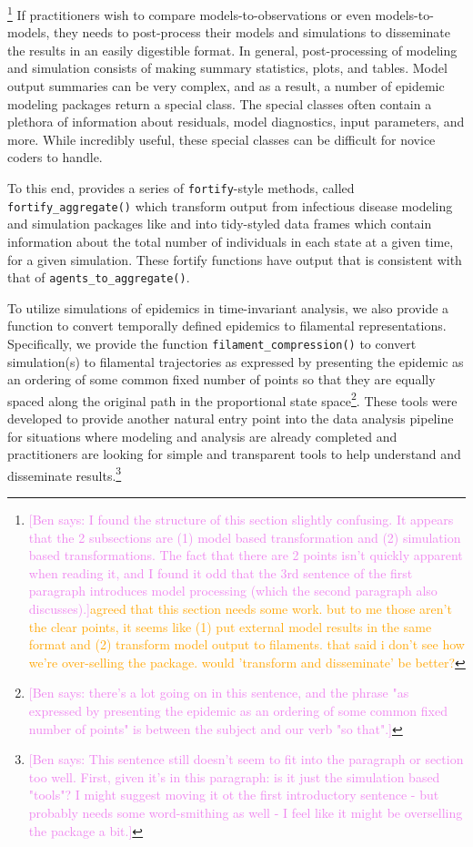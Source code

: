 \documentclass[
  shortnames]{jss}
\begin{document}
\footnote{\textcolor{violet}{[Ben says: I found the structure of this section slightly confusing. It appears that the 2 subsections are (1) model based transformation and (2) simulation based transformations. The fact that there are 2 points isn't quickly apparent when reading it, and I found it odd that the 3rd sentence of the first paragraph introduces model processing (which the second paragraph also discusses).]}\textcolor{orange}{agreed that this section needs some work.  but to me those aren't the clear points, it seems like (1) put external model results in the same format and (2) transform model output to filaments.  that said i don't see how we're over-selling the package.  would 'transform and disseminate' be better?}}
If practitioners wish to compare models-to-observations or even
models-to-models, they needs to post-process their models and
simulations to disseminate the results in an easily digestible format.
In general, post-processing of modeling and simulation consists of
making summary statistics, plots, and tables. Model output summaries can
be very complex, and as a result, a number of epidemic modeling
 packages return a special class. The special classes often
contain a plethora of information about residuals, model diagnostics,
input parameters, and more. While incredibly useful, these special
classes can be difficult for novice coders to handle.

To this end,  provides a series of
\texttt{fortify}-style methods, called \texttt{fortify\_aggregate()}
which transform output from infectious disease modeling and simulation
packages like  and  into tidy-styled data frames
which contain information about the total number of individuals in each
state at a given time, for a given simulation. These fortify functions
have output that is consistent with that of
\texttt{agents\_to\_aggregate()}.

To utilize simulations of epidemics in time-invariant analysis, we also
provide a function to convert temporally defined epidemics to filamental
representations. Specifically, we provide the function
\texttt{filament\_compression()} to convert simulation(s) to filamental
trajectories as expressed by presenting the epidemic as an ordering of
some common fixed number of points so that they are equally spaced along
the original path in the proportional state
space\footnote{\textcolor{violet}{[Ben says: there's a lot going on in this sentence, and the phrase "as expressed by presenting the epidemic as an ordering of some common fixed number of points" is between the subject and our verb "so that".]}}.
These tools were developed to provide another natural entry point into
the  data analysis pipeline for situations where
modeling and analysis are already completed and practitioners are
looking for simple and transparent tools to help understand and
disseminate
results.\footnote{\textcolor{violet}{[Ben says: This sentence still doesn't seem to fit into the paragraph or section too well. First, given it's in this paragraph: is it just the simulation based "tools"? I might suggest moving it ot the first introductory sentence - but probably needs some word-smithing as well - I feel like it might be overselling the package a bit.]}}
\end{document}
